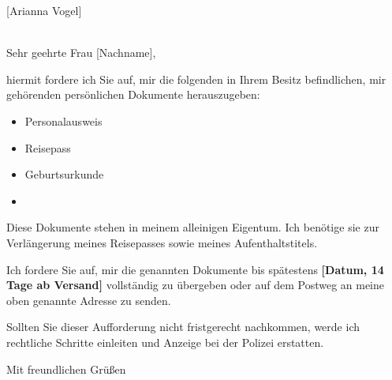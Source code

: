 \documentclass[11pt,a4paper]{letter}
\begin{document}
\begin{letter}{[Arianna Vogel]\\[Auf der Lichtung 19]\\[92178 Puchheim]}

\opening{Sehr geehrte Frau [Nachname],}

hiermit fordere ich Sie auf, mir die folgenden in Ihrem Besitz befindlichen,
mir gehörenden persönlichen Dokumente herauszugeben:

\begin{itemize}
  \item Personalausweis
  \item Reisepass
  \item Geburtsurkunde
  \item [weitere Dokumente einzeln auflisten]
\end{itemize}

Diese Dokumente stehen in meinem alleinigen Eigentum. Ich benötige sie zur
Verlängerung meines Reisepasses sowie meines Aufenthaltstitels.

Ich fordere Sie auf, mir die genannten Dokumente bis spätestens
\textbf{[Datum, 14 Tage ab Versand]} vollständig zu übergeben oder auf dem
Postweg an meine oben genannte Adresse zu senden.

Sollten Sie dieser Aufforderung nicht fristgerecht nachkommen, werde ich
rechtliche Schritte einleiten und Anzeige bei der Polizei erstatten.

\closing{Mit freundlichen Grüßen}

\end{letter}
\end{document}
